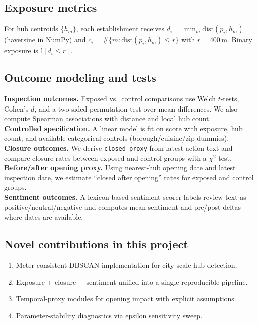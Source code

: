 \documentclass[10pt,twocolumn]{article}
\begin{document}
\subsection{Exposure metrics}
For hub centroids $\{h_m\}$, each establishment receives
$d_i=\min_m \mathrm{dist}(p_i,h_m)$ (haversine in NumPy) and
$c_i=\#\{m : \mathrm{dist}(p_i,h_m)\le r\}$ with $r{=}400$\,m. Binary exposure is $\mathbb{I}[d_i\le r]$.

\subsection{Outcome modeling and tests}
\textbf{Inspection outcomes.} Exposed vs.\ control comparisons use Welch $t$-tests, Cohen's $d$, and a two-sided permutation test over mean differences. We also compute Spearman associations with distance and local hub count. \\
\textbf{Controlled specification.} A linear model is fit on score with exposure, hub count, and available categorical controls (borough/cuisine/zip dummies). \\
\textbf{Closure outcomes.} We derive \texttt{closed\_proxy} from latest action text and compare closure rates between exposed and control groups with a $\chi^2$ test. \\
\textbf{Before/after opening proxy.} Using nearest-hub opening date and latest inspection date, we estimate ``closed after opening'' rates for exposed and control groups. \\
\textbf{Sentiment outcomes.} A lexicon-based sentiment scorer labels review text as positive/neutral/negative and computes mean sentiment and pre/post deltas where dates are available.

\subsection{Novel contributions in this project}
\begin{enumerate}
\item Meter-consistent DBSCAN implementation for city-scale hub detection.
\item Exposure + closure + sentiment unified into a single reproducible pipeline.
\item Temporal-proxy modules for opening impact with explicit assumptions.
\item Parameter-stability diagnostics via epsilon sensitivity sweep.
\end{enumerate}
\end{document}
